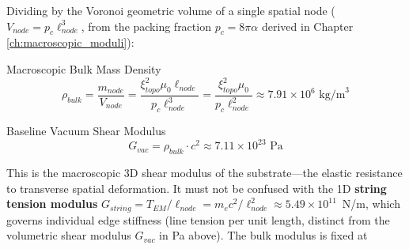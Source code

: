 Dividing by the Voronoi geometric volume of a single spatial node ($V_{node} = p_c \ell_{node}^3$, from the packing fraction $p_c = 8\pi\alpha$ derived in Chapter \ref{ch:macroscopic_moduli}):
\begin{resultbox}{Macroscopic Bulk Mass Density}
\begin{equation}
    \rho_{bulk} = \frac{m_{node}}{V_{node}} = \frac{\xi_{topo}^2 \mu_0 \ell_{node}}{p_c \ell_{node}^3} = \frac{\xi_{topo}^2 \mu_0}{p_c \ell_{node}^2} \approx 7.91 \times 10^6 \text{ kg/m}^3
\end{equation}
\end{resultbox}
\begin{resultbox}{Baseline Vacuum Shear Modulus}
\begin{equation}
    G_{vac} = \rho_{bulk} \cdot c^2 \approx 7.11 \times 10^{23} \text{ Pa}
\end{equation}
\end{resultbox}
This is the macroscopic 3D shear modulus of the substrate---the elastic
resistance to transverse spatial deformation. It must not be confused with the
1D \textbf{string tension modulus} $G_{string} = T_{EM}/\ell_{node} = m_e c^2 / \ell_{node}^2
\approx 5.49 \times 10^{11}$~N/m, which governs individual edge stiffness (line tension per unit length, distinct from the volumetric shear modulus $G_{vac}$ in Pa above). The bulk modulus is fixed at
